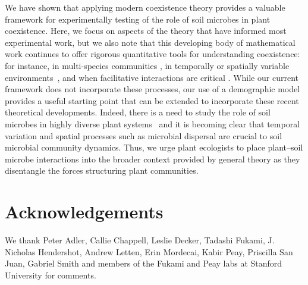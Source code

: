 We have shown that applying modern coexistence theory provides a valuable framework for experimentally testing of the role of soil microbes in plant coexistence.
Here, we focus on aspects of the theory that have informed most experimental work, but we also note that this developing body of mathematical work continues to offer rigorous quantitative tools for understanding coexistence: for instance, in multi-species communities \citep{Saavedra2017}, in temporally or spatially variable environments~\citep{Ellner2019}, and when facilitative interactions are critical \citep{Bimler2018}.
While our current framework does not incorporate these processes, our use of a demographic model provides a useful starting point that can be extended to incorporate these recent theoretical developments.
Indeed, there is a need to study the role of soil microbes in highly diverse plant systems~\citep{Johnson2012} and it is becoming clear that temporal variation and spatial processes such as microbial dispersal \citep{Peay2016} are crucial to soil microbial community dynamics.
Thus, we urge plant ecologists to place plant--soil microbe interactions into the broader context provided by general theory as they disentangle the forces structuring plant communities.
\par



\section{Acknowledgements}
We thank Peter Adler, Callie Chappell, Leslie Decker, Tadashi Fukami, J. Nicholas Hendershot, Andrew Letten, Erin Mordecai, Kabir Peay, Priscilla San Juan, Gabriel Smith and members of the Fukami and Peay labs at Stanford University for comments.
\par



\clearpage
